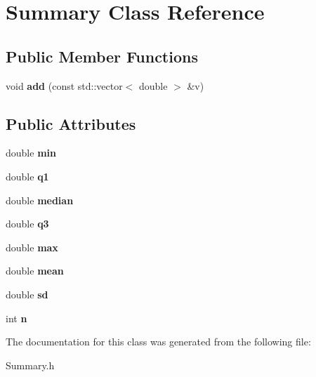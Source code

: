 \hypertarget{classSummary}{\section{Summary Class Reference}
\label{classSummary}
}
\subsection*{Public Member Functions}
\begin{DoxyCompactItemize}
\item 
\hypertarget{classSummary_ae28f345fbe1ad93d827b794b794b9cdc}{void {\bfseries add} (const std\-::vector$<$ double $>$ \&v)}\label{classSummary_ae28f345fbe1ad93d827b794b794b9cdc}

\end{DoxyCompactItemize}
\subsection*{Public Attributes}
\begin{DoxyCompactItemize}
\item 
\hypertarget{classSummary_a1dddaed512bba6bb9ee05d5524957a83}{double {\bfseries min}}\label{classSummary_a1dddaed512bba6bb9ee05d5524957a83}

\item 
\hypertarget{classSummary_a9cd53f493ab67ebf72a415bfb54b1b6e}{double {\bfseries q1}}\label{classSummary_a9cd53f493ab67ebf72a415bfb54b1b6e}

\item 
\hypertarget{classSummary_ae571634b59f79bf4d542e348c9af5162}{double {\bfseries median}}\label{classSummary_ae571634b59f79bf4d542e348c9af5162}

\item 
\hypertarget{classSummary_acf4deb21b9e231bd0e06a058c7c27133}{double {\bfseries q3}}\label{classSummary_acf4deb21b9e231bd0e06a058c7c27133}

\item 
\hypertarget{classSummary_a9009a80ad03d3e04f52012a736331caa}{double {\bfseries max}}\label{classSummary_a9009a80ad03d3e04f52012a736331caa}

\item 
\hypertarget{classSummary_aa04053684b9e18daaadbad2230982216}{double {\bfseries mean}}\label{classSummary_aa04053684b9e18daaadbad2230982216}

\item 
\hypertarget{classSummary_aeca0cb835e436a26ae1fbee6dea2ebed}{double {\bfseries sd}}\label{classSummary_aeca0cb835e436a26ae1fbee6dea2ebed}

\item 
\hypertarget{classSummary_af4b5493fad630e07d86565574a5bb839}{int {\bfseries n}}\label{classSummary_af4b5493fad630e07d86565574a5bb839}

\end{DoxyCompactItemize}


The documentation for this class was generated from the following file\-:\begin{DoxyCompactItemize}
\item 
Summary.\-h\end{DoxyCompactItemize}
